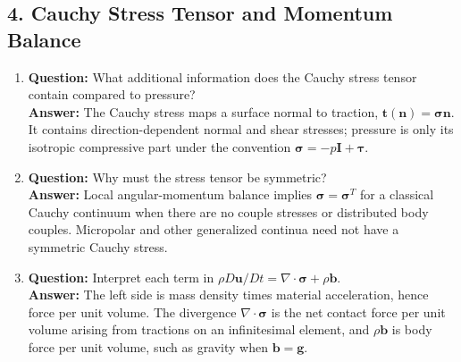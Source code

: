 \documentclass[12pt]{article}
\begin{document}
\subsection*{4. Cauchy Stress Tensor and Momentum Balance}
\begin{enumerate}
\item \textbf{Question:} What additional information does the Cauchy stress tensor contain compared to pressure?\\
\textbf{Answer:} The Cauchy stress maps a surface normal to traction, $\mathbf{t}(\mathbf{n})=\boldsymbol{\sigma}\mathbf{n}$. It contains direction-dependent normal and shear stresses; pressure is only its isotropic compressive part under the convention $\boldsymbol{\sigma}=-p\mathbf{I}+\boldsymbol{\tau}$.

\item \textbf{Question:} Why must the stress tensor be symmetric?\\
\textbf{Answer:} Local angular-momentum balance implies $\boldsymbol{\sigma}=\boldsymbol{\sigma}^{T}$ for a classical Cauchy continuum when there are no couple stresses or distributed body couples. Micropolar and other generalized continua need not have a symmetric Cauchy stress.

\item \textbf{Question:} Interpret each term in $\rho D\mathbf{u}/Dt = \nabla \cdot \boldsymbol{\sigma} + \rho \mathbf{b}$.\\
\textbf{Answer:} The left side is mass density times material acceleration, hence force per unit volume. The divergence $\nabla\cdot\boldsymbol{\sigma}$ is the net contact force per unit volume arising from tractions on an infinitesimal element, and $\rho\mathbf{b}$ is body force per unit volume, such as gravity when $\mathbf{b}=\mathbf{g}$.
\end{enumerate}
\end{document}
